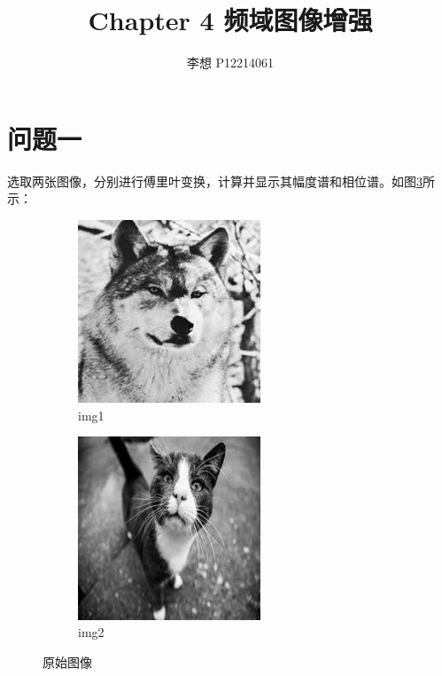 \documentclass[UTF8]{article}
\title{Chapter 4 频域图像增强}
\author{李想 \quad P12214061}
\begin{document}
\maketitle

\section{问题一}
选取两张图像，分别进行傅里叶变换，计算并显示其幅度谱和相位谱。如图\ref{fig:figures}所示：

\begin{figure}[htbp]
    \centering
    \begin{subfigure}{0.4\textwidth}
      \centering
      \includegraphics[width=0.6\textwidth]{../img/img1_1.jpg}
      \caption{img1}
      \label{fig:subfig1} %
    \end{subfigure}
    \hfill
    \begin{subfigure}{0.4\textwidth}
      \centering
      \includegraphics[width=0.6\textwidth]{../img/img2_1.jpg}
      \caption{img2}
      \label{fig:subfig2} %
    \end{subfigure}
    \caption{原始图像}
    \label{fig:figures} %
  \end{figure}
  
\end{document}
